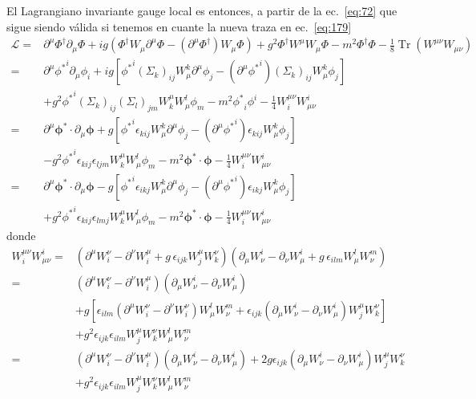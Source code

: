 El Lagrangiano invariante gauge local es entonces, a partir de la ec.~\eqref{eq:72} que sigue siendo v\'alida si tenemos en cuante la nueva traza en ec.~\eqref{eq:179}
\begin{align}
  \label{eq:177}
  \mathcal{L}=&\partial^\mu\Phi^\dagger\partial_\mu\Phi+ig\left(\Phi^\dagger W_\mu\partial^\mu\Phi-\left(\partial^\mu\Phi^\dagger\right)W_\mu\Phi\right)+g^2\Phi^\dagger W^\mu W_\mu\Phi
-m^2\Phi^\dagger \Phi
-\tfrac{1}{8}\operatorname{Tr}\left(W^{\mu\nu}W_{\mu\nu}\right)\nonumber\\
  =&\partial^\mu{\phi^*}^i\partial_\mu\phi_i+ig\left[{\phi^*}^i(\Sigma_{k})_{ij} W_\mu^k\partial^\mu\phi_j-\left(\partial^\mu{\phi^*}^i\right)(\Sigma_k)_{ij}W_\mu^k\phi_j\right]
  \nonumber\\
  &+g^2{\phi^*}^i (\Sigma_k)_{ij}(\Sigma_l)_{jm}W^\mu_k W_\mu^l\phi_m-m^2{\phi^*}_i \phi^i-\tfrac{1}{4}W^{\mu\nu}_iW_{\mu\nu}^i\nonumber\\
=&\partial^\mu{\boldsymbol{\phi}^*}\cdot\partial_\mu\boldsymbol{\phi}+g\left[{\phi^*}^i\epsilon_{kij} W_\mu^k\partial^\mu\phi_j-\left(\partial^\mu{\phi^*}^i\right)\epsilon_{kij}W_\mu^k\phi_j\right]
  \nonumber\\
  &-g^2{\phi^*}^i \epsilon_{kij}\epsilon_{ljm}W^\mu_k W_\mu^l\phi_m-m^2{\boldsymbol{\phi}^*}\cdot \boldsymbol{\phi}-\tfrac{1}{4}W^{\mu\nu}_iW_{\mu\nu}^i\nonumber\\
  =&\partial^\mu{\boldsymbol{\phi}^*}\cdot\partial_\mu\boldsymbol{\phi}-g\left[{\phi^*}^i\epsilon_{ikj} W_\mu^k\partial^\mu\phi_j-\left(\partial^\mu{\phi^*}^i\right)\epsilon_{ikj}W_\mu^k\phi_j\right]
  \nonumber\\
  &+g^2{\phi^*}^i \epsilon_{kij}\epsilon_{lmj}W^\mu_k W_\mu^l\phi_m-m^2{\boldsymbol{\phi}^*} \cdot\boldsymbol{\phi}-\tfrac{1}{4}W^{\mu\nu}_iW_{\mu\nu}^i
\end{align}
donde
\begin{align}
  \label{eq:178}
  {W}^{\mu\nu}_i{W}_{\mu\nu}^i=&(\partial^\mu W^\nu_i -\partial^\nu W^\mu_i+g\,\epsilon_{ijk}W^\mu_j W^\nu_k)(\partial_\mu W_\nu^i -\partial_\nu W_\mu^i+g\,\epsilon_{ilm}W_\mu^l W_\nu^m)\nonumber\\
    =&(\partial^\mu W^\nu_i -\partial^\nu W^\mu_i)(\partial_\mu W_\nu^i -\partial_\nu W_\mu^i)\nonumber\\
    &+g[\epsilon_{ilm}(\partial^\mu W^\nu_i -\partial^\nu W^\nu_i)W_\mu^l W_\nu^m+\epsilon_{ijk}(\partial_\mu W_\nu^i -\partial_\nu W_\mu^i)W^\mu_j W^\nu_k]\nonumber\\
    &+g^2\epsilon_{ijk}\epsilon_{ilm}W^\mu_j W^\nu_k W_\mu^l W_\nu^m\nonumber\\
    =&(\partial^\mu W^\nu_i -\partial^\nu W^\mu_i)(\partial_\mu W_\nu^i -\partial_\nu W_\mu^i)
    +2g\epsilon_{ijk}(\partial_\mu W_\nu^i -\partial_\nu W_\mu^i)W^\mu_j W^\nu_k\nonumber\\
    &+g^2\epsilon_{ijk}\epsilon_{ilm}W^\mu_j W^\nu_k W_\mu^l W_\nu^m
\end{align}
